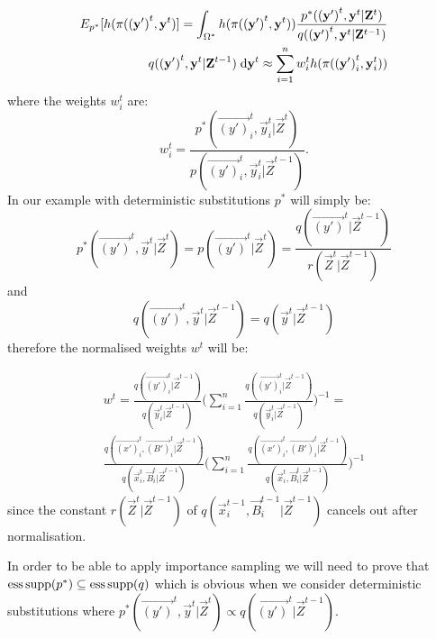 \begin{align*}
    E_{p^*}[h(\pi (\mathbf{(y')}^{t}, \mathbf{y}^{t})] = \int_{\Omega^*} h(\pi(\mathbf{(y')}^{t}, \mathbf{y}^{t})) \frac{p^*(\mathbf{(y')}^{t}, \mathbf{y}^{t}|\mathbf{Z}^{t})} {q(\mathbf{(y')}^{t}, \mathbf{y}^{t} | \mathbf{Z}^{t-1})} \\
    q(\mathbf{(y')}^{t}, \mathbf{y}^{t} | \mathbf{Z}^{t-1}) \; \mathrm{d} \mathbf{y}^{t} \approx \sum_{i=1}^n  w^{t}_i h(\pi (\mathbf{(y')}^{t}_i, \mathbf{y}^{t}_i))
\end{align*}
where the weights $w^{t}_i$ are:
\begin{equation*}
    w^{t}_i = \frac{p^*(\vec{(y')}^{t}_i, \vec{y}^{t}_i | \vec{Z}^{t})} {p(\vec{(y')}^{t}_i, \vec{y}^{t}_i|\vec{Z}^{t-1})}.
\end{equation*}
In our example with deterministic substitutions $p^*$ will simply be:
\begin{equation*}
    p^*(\vec{(y')}^{t}, \vec{y}^{t} | \vec{Z}^{t}) = p(\vec{(y')}^{t} | \vec{Z}^{t}) = \frac{ q(\vec{(y')}^{t}|\vec{Z}^{t-1})} {r(\vec{Z}^{t} | \vec{Z}^{t-1})}
\end{equation*}
and
\begin{equation*}
    q(\vec{(y')}^{t}, \vec{y}^{t} | \vec{Z}^{t-1}) = q(\vec{y}^{t} | \vec{Z}^{t-1})
\end{equation*}
therefore the normalised weights $w^t$ will be:

\begin{multline*}
    w^{t} = \frac{q(\vec{(y')}^{t}_i | \vec{Z}^{t-1}) }{q(\vec{y}^{t}_i | \vec{Z}^{t-1})}\Bigg( \sum_{i=1}^n  \frac{q(\vec{(y')}^{t}_i | \vec{Z}^{t-1}) }{q(\vec{y}^{t}_i | \vec{Z}^{t-1})}\Bigg)^{-1} = \\
    \frac{q(\vec{(x')}^{t}_i, \vec{(B')}^{t}_i | \vec{Z}^{t-1}) }{q(\vec{x}^{t}_i, \vec{B}^{t}_i | \vec{Z}^{t-1})}\Bigg( \sum_{i=1}^n \frac{q(\vec{(x')}^{t}_i, \vec{(B')}^{t}_i | \vec{Z}^{t-1}) }{q(\vec{x}^{t}_i, \vec{B}^{t}_i | \vec{Z}^{t-1})}\Bigg)^{-1}
\end{multline*}
since the constant $r(\vec{Z}^t | \vec{Z}^{t-1})$ of $q(\vec{x}^{t-1}_i,\vec{B}^{t-1}_i | \vec{Z}^{t-1})$ cancels out after normalisation.

In order to be able to apply importance sampling we will need to prove that $\operatorname{ess\,supp}(p^*) \subseteq \operatorname{ess\,supp}(q)$
which is obvious when we consider deterministic substitutions where $p^*(\vec{(y')}^{t}, \vec{y}^{t} | \vec{Z}^{t}) \propto q(\vec{(y')}^{t}|\vec{Z}^{t-1})$.





